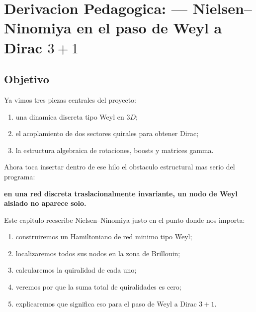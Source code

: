 \chapter{Derivacion Pedagogica: --- Nielsen--Ninomiya en el paso de Weyl a Dirac \(3+1\)}
\label{ch:nielsen-ninomiya-weyl-dirac-3p1}





\section{Objetivo}
Ya vimos tres piezas centrales del proyecto:
\begin{enumerate}[label=\arabic*.]
    \item una dinamica discreta tipo Weyl en \(3D\);
    \item el acoplamiento de dos sectores quirales para obtener Dirac;
    \item la estructura algebraica de rotaciones, boosts y matrices gamma.
\end{enumerate}

Ahora toca insertar dentro de ese hilo el obstaculo estructural mas serio del programa:
\begin{displayquote}
\textbf{en una red discreta traslacionalmente invariante, un nodo de Weyl aislado no aparece solo.}
\end{displayquote}

Este capitulo reescribe Nielsen--Ninomiya justo en el punto donde nos importa:
\begin{enumerate}[label=\arabic*.]
    \item construiremos un Hamiltoniano de red minimo tipo Weyl;
    \item localizaremos todos sus nodos en la zona de Brillouin;
    \item calcularemos la quiralidad de cada uno;
    \item veremos por que la suma total de quiralidades es cero;
    \item explicaremos que significa eso para el paso de Weyl a Dirac \(3+1\).
\end{enumerate}

